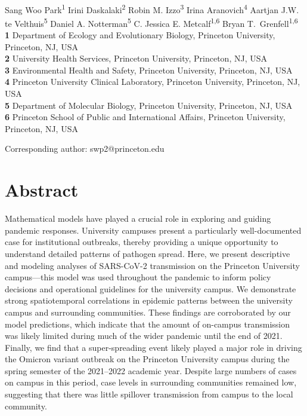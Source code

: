 \documentclass[12pt]{article}
\date{\today}
\begin{document}
\begin{flushleft}{
	\Large
	\textbf{}
}
\newline
\\
Sang Woo Park\textsuperscript{1}
Irini Daskalaki\textsuperscript{2}
Robin M. Izzo\textsuperscript{3}
Irina Aranovich\textsuperscript{4}
Aartjan J.W. te Velthuis\textsuperscript{5}
Daniel A. Notterman\textsuperscript{5}
C. Jessica E. Metcalf\textsuperscript{1,6}
Bryan T.\ Grenfell\textsuperscript{1,6}
\\
\bigskip
\textbf{1} Department of Ecology and Evolutionary Biology, Princeton University, Princeton, NJ, USA
\\
\textbf{2} University Health Services, Princeton University, Princeton, NJ, USA
\\
\textbf{3} Environmental Health and Safety, Princeton University, Princeton, NJ, USA
\\
\textbf{4} Princeton University Clinical Laboratory, Princeton University, Princeton, NJ, USA
\\
\textbf{5} Department of Molecular Biology, Princeton University, Princeton, NJ, USA
\\
\textbf{6} Princeton School of Public and International Affairs, Princeton University, Princeton, NJ, USA
\\
\bigskip

Corresponding author: swp2@princeton.edu
\bigskip
\end{flushleft}

\section*{Abstract}

Mathematical models have played a crucial role in exploring and guiding pandemic responses. 
University campuses present a particularly well-documented case for institutional outbreaks, thereby providing a unique opportunity to understand detailed patterns of pathogen spread.
Here, we present descriptive and modeling analyses of SARS-CoV-2 transmission on the Princeton University campus---this model was used throughout the pandemic to inform policy decisions and operational guidelines for the university campus.
We demonstrate strong spatiotemporal correlations in epidemic patterns between the university campus and surrounding communities.
These findings are corroborated by our model predictions, which indicate that the amount of on-campus transmission was likely limited during much of the wider pandemic until the end of 2021.
Finally, we find that a super-spreading event likely played a major role in driving the Omicron variant outbreak on the Princeton University campus during the spring semester of the 2021--2022 academic year.
Despite large numbers of cases on campus in this period, case levels in surrounding communities remained low, suggesting that there was little spillover transmission from campus to the local community.
\end{document}
